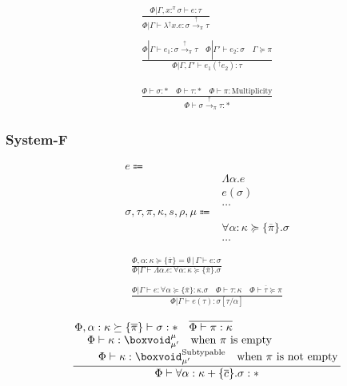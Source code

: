 \documentclass {article}
\begin{document}
\begin{gather*}
\frac
{\Phi | \Gamma, x :^\pi \sigma \vdash e : \tau}
{\Phi | \Gamma \vdash \lambda^\uparrow x. e : \sigma \xrightarrow{\uparrow}_\pi \tau } \\
\\
\frac
{\Phi | \Gamma \vdash e_1 : \sigma \xrightarrow{\uparrow}_\pi \tau \quad \Phi | \Gamma' \vdash e_2 : \sigma \quad \Gamma \succeq \pi}
{\Phi | \Gamma, \Gamma' \vdash e_1(^\uparrow e_2) : \tau}
\end{gather*}

\begin{gather*}
\frac
{\Phi \vdash \sigma : * \quad \Phi \vdash \tau : * \quad \Phi \vdash \pi : \text{Multiplicity}}
{\Phi \vdash \sigma \xrightarrow{\uparrow}_\pi \tau  : * }
\end{gather*}

\subsubsection{System-F}
\begin{align*}
e \Coloneqq & \\
& \Lambda \alpha. e \tag{Type Lambda} \\
& e (\sigma) \tag{Type Application} \\
& \dots \\
\sigma, \tau, \pi, \kappa, s, \rho, \mu \Coloneqq & \\
& \forall \alpha : \kappa \succeq \{ \overline \pi \}. \sigma \tag{Type Poly}\\ 
& \dots
\end{align*}

\begin{gather*}
\frac
{\Phi, \alpha : \kappa  \succeq \{ \overline \pi \} = \emptyset \, | \, \Gamma \vdash e : \sigma}
{\Phi | \Gamma \vdash \Lambda \alpha. e : \forall \alpha : \kappa \succeq \{ \overline \pi \} . \sigma } \\
\\
\frac
{\Phi | \Gamma \vdash e : \forall \alpha \succeq \{ \overline \pi \} : \kappa. \sigma \quad \Phi \vdash \tau : \kappa\quad \overline { \Phi \vdash \tau \succeq \pi }}
{\Phi | \Gamma \vdash e (\tau) : \sigma [\tau/\alpha] }
\end{gather*}

\begin{gather*}
\frac
{\splitfrac{\Phi, \alpha : \kappa \succeq \{ \overline \pi \}\vdash \sigma : * \quad \overline { \Phi \vdash \pi : \kappa}}
{\splitfrac{\Phi \vdash \kappa : \boxvoid^\mu_{\mu'} \quad \text{when $ \pi $ is empty}}
{\Phi \vdash \kappa : \boxvoid^\text{Subtypable}_{\mu'} \quad \text{when $ \pi $ is not empty} }}}
{\Phi \vdash \forall \alpha : \kappa + \{ \overline c \}. \sigma : * } \\
\end{gather*}
\end{document}
